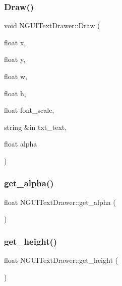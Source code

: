 \hypertarget{class_n_g_u_i_text_drawer_a3a65ebbdbe45bd811af16a4945503ed4}{}\label{class_n_g_u_i_text_drawer_a3a65ebbdbe45bd811af16a4945503ed4} 
\subsubsection{\texorpdfstring{Draw()}{Draw()}\hspace{0.1cm}{\footnotesize\ttfamily [3/3]}}
{\footnotesize\ttfamily void N\+G\+U\+I\+Text\+Drawer\+::\+Draw (\begin{DoxyParamCaption}\item[{float}]{x,  }\item[{float}]{y,  }\item[{float}]{w,  }\item[{float}]{h,  }\item[{float}]{font\+\_\+scale,  }\item[{string \&in}]{txt\+\_\+text,  }\item[{float}]{alpha }\end{DoxyParamCaption})}

\hypertarget{class_n_g_u_i_text_drawer_a31bb55149ec209961ead17b41e067be5}{}\label{class_n_g_u_i_text_drawer_a31bb55149ec209961ead17b41e067be5} 
\subsubsection{\texorpdfstring{get\+\_\+alpha()}{get\_alpha()}}
{\footnotesize\ttfamily float N\+G\+U\+I\+Text\+Drawer\+::get\+\_\+alpha (\begin{DoxyParamCaption}{ }\end{DoxyParamCaption})}

\hypertarget{class_n_g_u_i_text_drawer_ad8593236c0ac75c02580cff1b39ff655}{}\label{class_n_g_u_i_text_drawer_ad8593236c0ac75c02580cff1b39ff655} 
\subsubsection{\texorpdfstring{get\+\_\+height()}{get\_height()}}
{\footnotesize\ttfamily float N\+G\+U\+I\+Text\+Drawer\+::get\+\_\+height (\begin{DoxyParamCaption}{ }\end{DoxyParamCaption})}

